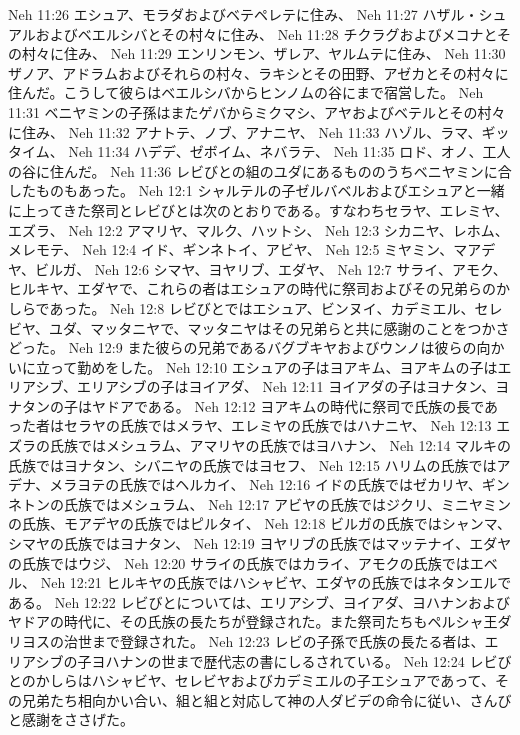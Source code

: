 Neh 11:26  エシュア、モラダおよびベテペレテに住み、
Neh 11:27  ハザル・シュアルおよびベエルシバとその村々に住み、
Neh 11:28  チクラグおよびメコナとその村々に住み、
Neh 11:29  エンリンモン、ザレア、ヤルムテに住み、
Neh 11:30  ザノア、アドラムおよびそれらの村々、ラキシとその田野、アゼカとその村々に住んだ。こうして彼らはベエルシバからヒンノムの谷にまで宿営した。
Neh 11:31  ベニヤミンの子孫はまたゲバからミクマシ、アヤおよびベテルとその村々に住み、
Neh 11:32  アナトテ、ノブ、アナニヤ、
Neh 11:33  ハゾル、ラマ、ギッタイム、
Neh 11:34  ハデデ、ゼボイム、ネバラテ、
Neh 11:35  ロド、オノ、工人の谷に住んだ。
Neh 11:36  レビびとの組のユダにあるもののうちベニヤミンに合したものもあった。
Neh 12:1  シャルテルの子ゼルバベルおよびエシュアと一緒に上ってきた祭司とレビびとは次のとおりである。すなわちセラヤ、エレミヤ、エズラ、
Neh 12:2  アマリヤ、マルク、ハットシ、
Neh 12:3  シカニヤ、レホム、メレモテ、
Neh 12:4  イド、ギンネトイ、アビヤ、
Neh 12:5  ミヤミン、マアデヤ、ビルガ、
Neh 12:6  シマヤ、ヨヤリブ、エダヤ、
Neh 12:7  サライ、アモク、ヒルキヤ、エダヤで、これらの者はエシュアの時代に祭司およびその兄弟らのかしらであった。
Neh 12:8  レビびとではエシュア、ビンヌイ、カデミエル、セレビヤ、ユダ、マッタニヤで、マッタニヤはその兄弟らと共に感謝のことをつかさどった。
Neh 12:9  また彼らの兄弟であるバグブキヤおよびウンノは彼らの向かいに立って勤めをした。
Neh 12:10  エシュアの子はヨアキム、ヨアキムの子はエリアシブ、エリアシブの子はヨイアダ、
Neh 12:11  ヨイアダの子はヨナタン、ヨナタンの子はヤドアである。
Neh 12:12  ヨアキムの時代に祭司で氏族の長であった者はセラヤの氏族ではメラヤ、エレミヤの氏族ではハナニヤ、
Neh 12:13  エズラの氏族ではメシュラム、アマリヤの氏族ではヨハナン、
Neh 12:14  マルキの氏族ではヨナタン、シバニヤの氏族ではヨセフ、
Neh 12:15  ハリムの氏族ではアデナ、メラヨテの氏族ではヘルカイ、
Neh 12:16  イドの氏族ではゼカリヤ、ギンネトンの氏族ではメシュラム、
Neh 12:17  アビヤの氏族ではジクリ、ミニヤミンの氏族、モアデヤの氏族ではピルタイ、
Neh 12:18  ビルガの氏族ではシャンマ、シマヤの氏族ではヨナタン、
Neh 12:19  ヨヤリブの氏族ではマッテナイ、エダヤの氏族ではウジ、
Neh 12:20  サライの氏族ではカライ、アモクの氏族ではエベル、
Neh 12:21  ヒルキヤの氏族ではハシャビヤ、エダヤの氏族ではネタンエルである。
Neh 12:22  レビびとについては、エリアシブ、ヨイアダ、ヨハナンおよびヤドアの時代に、その氏族の長たちが登録された。また祭司たちもペルシャ王ダリヨスの治世まで登録された。
Neh 12:23  レビの子孫で氏族の長たる者は、エリアシブの子ヨハナンの世まで歴代志の書にしるされている。
Neh 12:24  レビびとのかしらはハシャビヤ、セレビヤおよびカデミエルの子エシュアであって、その兄弟たち相向かい合い、組と組と対応して神の人ダビデの命令に従い、さんびと感謝をささげた。
